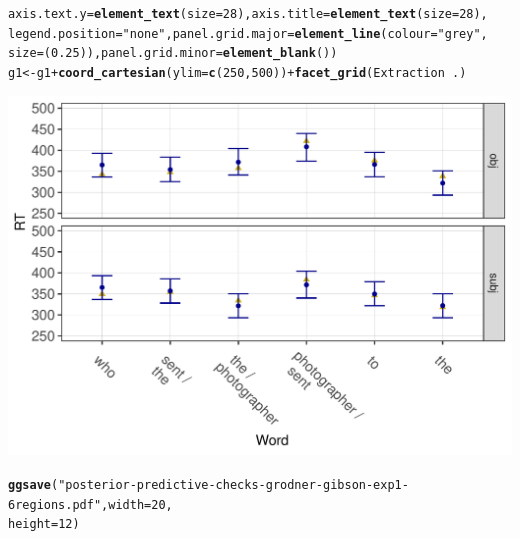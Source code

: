 \documentclass{article}\usepackage[]{graphicx}\usepackage[]{color}
\makeatletter
\def\maxwidth{ %
  \ifdim\Gin@nat@width>\linewidth
    \linewidth
  \else
    \Gin@nat@width
  \fi
}
\newcommand{\hlnum}[1]{\textcolor[rgb]{0.686,0.059,0.569}{#1}}%
\newcommand{\hlstr}[1]{\textcolor[rgb]{0.192,0.494,0.8}{#1}}%
\newcommand{\hlopt}[1]{\textcolor[rgb]{0,0,0}{#1}}%
\newcommand{\hlstd}[1]{\textcolor[rgb]{0.345,0.345,0.345}{#1}}%
\newcommand{\hlkwb}[1]{\textcolor[rgb]{0.69,0.353,0.396}{#1}}%
\newcommand{\hlkwc}[1]{\textcolor[rgb]{0.333,0.667,0.333}{#1}}%
\newcommand{\hlkwd}[1]{\textcolor[rgb]{0.737,0.353,0.396}{\textbf{#1}}}%
\newenvironment{kframe}{%
 \def\at@end@of@kframe{}%
 \ifinner\ifhmode%
  \def\at@end@of@kframe{\end{minipage}}%
  \begin{minipage}{\columnwidth}%
 \fi\fi%
 \def\FrameCommand##1{\hskip\@totalleftmargin \hskip-\fboxsep
 \colorbox{shadecolor}{##1}\hskip-\fboxsep
     \hskip-\linewidth \hskip-\@totalleftmargin \hskip\columnwidth}%
 \MakeFramed {\advance\hsize-\width
   \@totalleftmargin\z@ \linewidth\hsize
   \@setminipage}}%
 {\par\unskip\endMakeFramed%
 \at@end@of@kframe}
\newenvironment{knitrout}{}{} %
\makeatother
\begin{document}
\begin{knitrout}
\begin{kframe}
\begin{alltt}
    \hlkwc{axis.text.y} \hlstd{=} \hlkwd{element_text}\hlstd{(}\hlkwc{size} \hlstd{=} \hlnum{28}\hlstd{),} \hlkwc{axis.title} \hlstd{=} \hlkwd{element_text}\hlstd{(}\hlkwc{size} \hlstd{=} \hlnum{28}\hlstd{),}
    \hlkwc{legend.position} \hlstd{=} \hlstr{"none"}\hlstd{,} \hlkwc{panel.grid.major} \hlstd{=} \hlkwd{element_line}\hlstd{(}\hlkwc{colour} \hlstd{=} \hlstr{"grey"}\hlstd{,}
        \hlkwc{size} \hlstd{= (}\hlnum{0.25}\hlstd{)),} \hlkwc{panel.grid.minor} \hlstd{=} \hlkwd{element_blank}\hlstd{())}
\hlstd{g1} \hlkwb{<-} \hlstd{g1} \hlopt{+} \hlkwd{coord_cartesian}\hlstd{(}\hlkwc{ylim} \hlstd{=} \hlkwd{c}\hlstd{(}\hlnum{250}\hlstd{,} \hlnum{500}\hlstd{))} \hlopt{+} \hlkwd{facet_grid}\hlstd{(Extraction} \hlopt{~} \hlstd{.)}
\end{alltt}
\end{kframe}
\end{knitrout}

\begin{knitrout}
\color{fgcolor}
\includegraphics[width=\maxwidth]{figures/figure7regionsunnamed-chunk-9-1} 

\end{knitrout}


\begin{knitrout}
\color{fgcolor}\begin{kframe}
\begin{alltt}
\hlkwd{ggsave}\hlstd{(}\hlstr{"posterior-predictive-checks-grodner-gibson-exp1-6regions.pdf"}\hlstd{,} \hlkwc{width} \hlstd{=} \hlnum{20}\hlstd{,}
    \hlkwc{height} \hlstd{=} \hlnum{12}\hlstd{)}
\end{alltt}
\end{kframe}
\end{knitrout}
\end{document}
